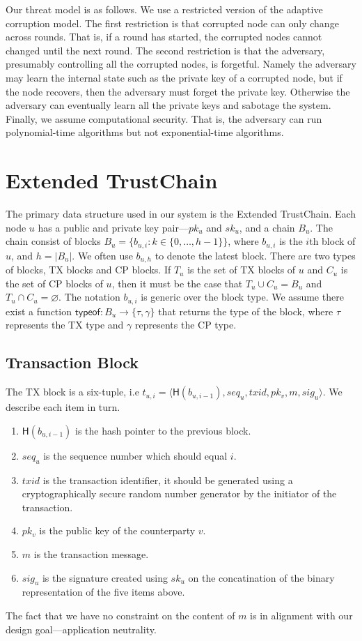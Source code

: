 Our threat model is as follows. 
We use a restricted version of the adaptive corruption model.
The first restriction is that corrupted node can only change across rounds.
That is, if a round has started, the corrupted nodes cannot changed until the next round.
The second restriction is that the adversary, presumably controlling all the corrupted nodes, is forgetful.
Namely the adversary may learn the internal state such as the private key of a corrupted node,
but if the node recovers, then the adversary must forget the private key.
Otherwise the adversary can eventually learn all the private keys and sabotage the system.
Finally, we assume computational security.
That is, the adversary can run polynomial-time algorithms but not exponential-time algorithms.

\section{Extended TrustChain}
The primary data structure used in our system is the Extended TrustChain.
Each node $u$ has a public and private key pair---$pk_u$ and $sk_u$, and a chain $B_u$.
The chain consist of blocks $B_u = \{ b_{u, i} : k \in \{ 0, \dots, h - 1 \} \}$,
where $b_{u, i}$ is the $i$th block of $u$,
and $h = |B_u|$.
We often use $b_{u, h}$ to denote the latest block.
There are two types of blocks, TX blocks and CP blocks.
If $T_u$ is the set of TX blocks of $u$ and $C_u$ is the set of CP blocks of $u$,
then it must be the case that $T_u \cup C_u = B_u$ and $T_u \cap C_u = \varnothing$.
The notation $b_{u, i}$ is generic over the block type.
We assume there exist a function $\textsf{typeof}: B_u \rightarrow \{ \tau, \gamma \}$ that returns the type of the block,
where $\tau$ represents the TX type and $\gamma$ represents the CP type.

\subsection{Transaction Block}
The TX block is a six-tuple, i.e $t_{u, i} = \langle \textsf{H}(b_{u, i - 1}), seq_u, txid, pk_v, m, sig_u \rangle$.
We describe each item in turn.
\begin{enumerate}
\item $\textsf{H}(b_{u, i - 1})$ is the hash pointer to the previous block.
\item $seq_u$ is the sequence number which should equal $i$.
\item $txid$ is the transaction identifier, it should be generated using a cryptographically secure random number generator by the initiator of the transaction.
\item $pk_v$ is the public key of the counterparty $v$.
\item $m$ is the transaction message.
\item $sig_u$ is the signature created using $sk_u$ on the concatination of the binary representation of the five items above.
\end{enumerate}
The fact that we have no constraint on the content of $m$ is in alignment with our design goal---application neutrality.


